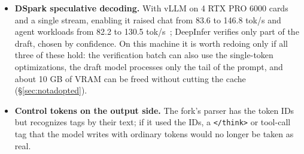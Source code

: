 \documentclass[11pt,a4paper]{article}
\newcommand{\code}[1]{\texttt{#1}}
\newcommand{\tps}{tok/s}
\begin{document}
\begin{itemize}
  \item \textbf{DSpark speculative decoding.} With vLLM on 4 RTX PRO 6000 cards and a single stream, enabling it raised chat from 83.6 to 146.8 \tps{} and agent workloads from 82.2 to 130.5 \tps{}~\cite{infatoshi}; DeepInfer verifies only part of the draft, chosen by confidence. On this machine it is worth redoing only if all three of these hold: the verification batch can also use the single-token optimizations, the draft model processes only the tail of the prompt, and about 10 GB of VRAM can be freed without cutting the cache (\S\ref{sec:notadopted}).
  \item \textbf{Control tokens on the output side.} The fork's parser has the token IDs but recognizes tags by their text; if it used the IDs, a \code{</think>} or tool-call tag that the model writes with ordinary tokens would no longer be taken as real.
\end{itemize}
\end{document}
